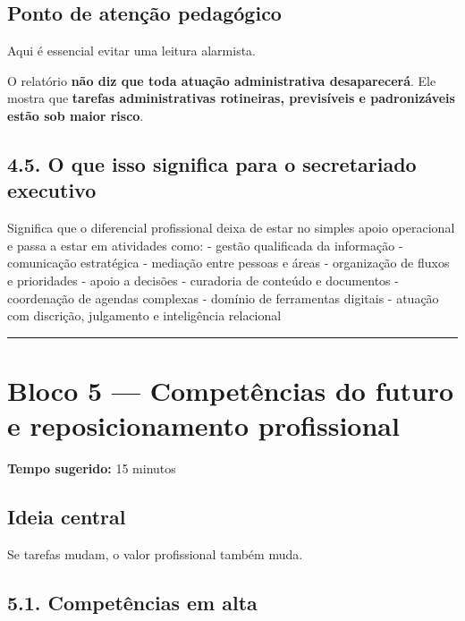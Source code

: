 \documentclass[
]{book}
\theoremstyle{definition}
\theoremstyle{definition}
\theoremstyle{definition}
\theoremstyle{definition}
\theoremstyle{remark}
\begin{document}
\subsection{Ponto de atenção pedagógico}\label{ponto-de-atenuxe7uxe3o-pedaguxf3gico}

Aqui é essencial evitar uma leitura alarmista.

O relatório \textbf{não diz que toda atuação administrativa desaparecerá}.
Ele mostra que \textbf{tarefas administrativas rotineiras, previsíveis e padronizáveis estão sob maior risco}.

\subsection{4.5. O que isso significa para o secretariado executivo}\label{o-que-isso-significa-para-o-secretariado-executivo}

Significa que o diferencial profissional deixa de estar no simples apoio operacional e passa a estar em atividades como:
- gestão qualificada da informação
- comunicação estratégica
- mediação entre pessoas e áreas
- organização de fluxos e prioridades
- apoio a decisões
- curadoria de conteúdo e documentos
- coordenação de agendas complexas
- domínio de ferramentas digitais
- atuação com discrição, julgamento e inteligência relacional

\begin{center}\rule{0.5\linewidth}{0.5pt}\end{center}

\section{Bloco 5 --- Competências do futuro e reposicionamento profissional}\label{bloco-5-competuxeancias-do-futuro-e-reposicionamento-profissional}

\textbf{Tempo sugerido:} 15 minutos

\subsection{Ideia central}\label{ideia-central-3}

Se tarefas mudam, o valor profissional também muda.

\subsection{5.1. Competências em alta}\label{competuxeancias-em-alta}
\end{document}
